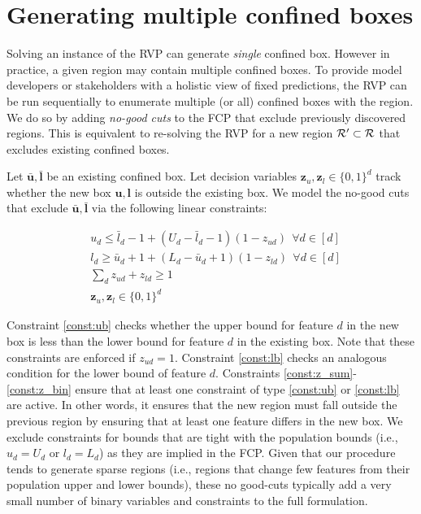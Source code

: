 \section{Generating multiple confined boxes} \label{app:multi_boxes}
Solving an instance of the RVP can generate \emph{single} confined box. However in practice, a given region may contain multiple confined boxes. To provide model developers or stakeholders with a holistic view of fixed predictions, the RVP can be run sequentially to enumerate multiple (or all) confined boxes with the region. We do so by adding \textit{no-good cuts} to the FCP that exclude previously discovered regions. This is equivalent to re-solving the RVP for a new region ${\cal R}' \subset {\cal R}$ that excludes existing confined boxes.

Let $\bar{\mathbf{u}}, \bar{\mathbf{l}}$ be an existing confined box. Let decision variables $\mathbf{z}_{u}, \mathbf{z}_{l} \in \{0, 1\}^d$ track whether the new box $\mathbf{u}, \mathbf{l}$ is outside the existing box. We model the no-good cuts that exclude $\bar{\mathbf{u}}, \bar{\mathbf{l}}$ via the following linear constraints:

\begin{subequations}
\begin{align}
	 &u_d \leq \bar{l}_d - 1 + (U_d - \bar{l}_d - 1)(1-z_{ud}) ~~ \forall d \in [d] \label{const:ub}\\
	& l_d \geq \bar{u}_d + 1 + (L_d - \bar{u}_d + 1)(1-z_{ld}) ~~ \forall d \in [d] \label{const:lb}\\
    &\sum_d z_{ud} + z_{ld} \geq 1 \label{const:z_sum} \\
    & \mathbf{z}_{u}, \mathbf{z}_{l} \in \{0, 1\}^d \label{const:z_bin} 
\end{align}
\end{subequations}

Constraint \eqref{const:ub} checks whether the upper bound for feature $d$ in the new box is less than the lower bound for feature $d$ in the existing box. Note that these constraints are enforced if $z_{ud} = 1$. Constraint \eqref{const:lb} checks an analogous condition for the lower bound of feature $d$. Constraints \eqref{const:z_sum}-\eqref{const:z_bin} ensure that at least one constraint of type \eqref{const:ub} or \eqref{const:lb} are active. In other words, it ensures that the new region must fall outside the previous region by ensuring that at least one feature differs in the new box. We exclude constraints for bounds that are tight with the population bounds (i.e., $u_d = U_d$ or $l_d = L_d$) as they are implied in the FCP. Given that our procedure tends to generate sparse regions (i.e., regions that change few features from their population upper and lower bounds), these no good-cuts typically add a very small number of binary variables and constraints to the full formulation.

